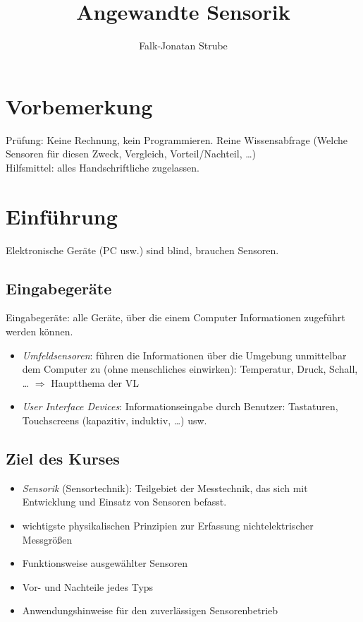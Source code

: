 \documentclass{scrreprt}
\title{Angewandte Sensorik}
\author{Falk-Jonatan Strube}
\begin{document}
\maketitle
\tableofcontents

\chapter*{Vorbemerkung}
Prüfung: Keine Rechnung, kein Programmieren. Reine Wissensabfrage (Welche Sensoren für diesen Zweck, Vergleich, Vorteil/Nachteil, …)\\
Hilfsmittel: alles Handschriftliche zugelassen.

\setcounter{chapter}{-1}
\chapter{Einführung}

Elektronische Geräte (PC usw.) sind blind, brauchen Sensoren.

\section{Eingabegeräte}
Eingabegeräte: alle Geräte, über die einem Computer Informationen zugeführt werden können.
\begin{itemize}
\item \emph{Umfeldsensoren}: führen die Informationen über die Umgebung unmittelbar dem Computer zu (ohne menschliches einwirken): Temperatur, Druck, Schall, … $\Rightarrow$ Hauptthema der VL
\item \emph{User Interface Devices}: Informationseingabe durch Benutzer: Tastaturen, Touchscreens (kapazitiv, induktiv, …) usw.
\end{itemize}

\section{Ziel des Kurses}
\begin{itemize}
\item \emph{Sensorik} (Sensortechnik): Teilgebiet der Messtechnik, das sich mit Entwicklung und Einsatz von Sensoren befasst.
\item wichtigste physikalischen Prinzipien zur Erfassung nichtelektrischer Messgrößen
\item Funktionsweise ausgewählter Sensoren
\item Vor- und Nachteile jedes Typs
\item Anwendungshinweise für den zuverlässigen Sensorenbetrieb
\end{itemize}
\end{document}
